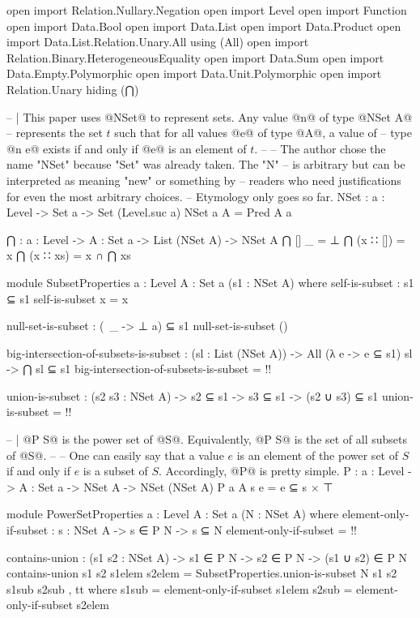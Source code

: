 \begin{code}
open import Relation.Nullary.Negation
open import Level
open import Function
open import Data.Bool
open import Data.List
open import Data.Product
open import Data.List.Relation.Unary.All using (All)
open import Relation.Binary.HeterogeneousEquality
open import Data.Sum
open import Data.Empty.Polymorphic
open import Data.Unit.Polymorphic
open import Relation.Unary hiding (⋂)

-- | This paper uses @NSet@ to represent sets.  Any value @n@ of type @NSet A@
-- represents the set \(t\) such that for all values @e@ of type @A@, a value of
-- type @n e@ exists if and only if @e@ is an element of \(t\).
--
-- The author chose the name "NSet" because "Set" was already taken.  The "N"
-- is arbitrary but can be interpreted as meaning "new" or something by
-- readers who need justifications for even the most arbitrary choices.
-- Etymology only goes so far.
NSet : {a : Level} -> Set a -> Set (Level.suc a)
NSet {a} A = Pred A a

⋂ : {a : Level} -> {A : Set a} -> List (NSet A) -> NSet A
⋂ [] _ = ⊥
⋂ (x ∷ []) = x
⋂ (x ∷ xs) = x ∩ ⋂ xs

module SubsetProperties {a : Level} {A : Set a} (s1 : NSet A) where
  self-is-subset : s1 ⊆ s1
  self-is-subset x = x

  null-set-is-subset : (\ _ -> ⊥ {a}) ⊆ s1
  null-set-is-subset ()

  big-intersection-of-subsets-is-subset :
    (sl : List (NSet A)) ->
    All (λ e -> e ⊆ s1) sl ->
    ⋂ sl ⊆ s1
  big-intersection-of-subsets-is-subset = {!!}

  union-is-subset :
    (s2 s3 : NSet A) ->
    s2 ⊆ s1 ->
    s3 ⊆ s1 ->
    (s2 ∪ s3) ⊆ s1
  union-is-subset = {!!}

-- | @P S@ is the power set of @S@.  Equivalently, @P S@ is the set of all subsets of @S@.
--
-- One can easily say that a value \(e\) is an element of the power set of \(S\) if and only if \(e\) is a subset of \(S\).  Accordingly, @P@ is pretty simple.
P : {a : Level} -> {A : Set a} -> NSet A -> NSet (NSet A)
P {a} {A} s e = e ⊆ s × ⊤

module PowerSetProperties {a : Level} {A : Set a} (N : NSet A) where
  element-only-if-subset : {s : NSet A} -> s ∈ P N -> s ⊆ N
  element-only-if-subset = {!!}

  contains-union : (s1 s2 : NSet A) -> s1 ∈ P N -> s2 ∈ P N -> (s1 ∪ s2) ∈ P N
  contains-union s1 s2 s1elem s2elem =
    SubsetProperties.union-is-subset N s1 s2 s1sub s2sub , tt
    where
      s1sub = element-only-if-subset s1elem
      s2sub = element-only-if-subset s2elem


\end{code}
